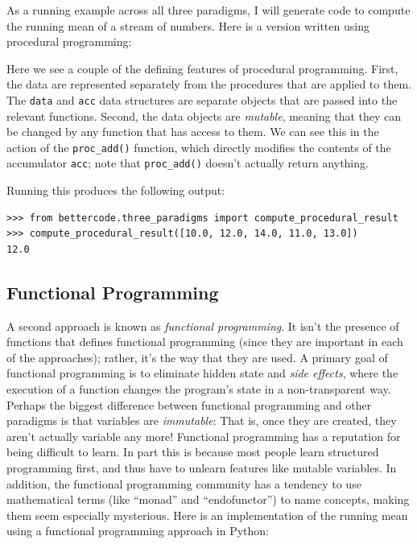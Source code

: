 As a running example across all three paradigms, I will generate code to compute the running mean of a stream of numbers.  Here is a version written using procedural programming:



Here we see a couple of the defining features of procedural programming.  First, the data are represented separately from the procedures that are applied to them.  The \texttt{data} and \texttt{acc} data structures are separate objects that are passed into the relevant functions.  Second, the data objects are \textit{mutable}, meaning that they can be changed by any function that has access to them. We can see this in the action of the \texttt{proc\_add()} function, which directly modifies the contents of the accumulator \texttt{acc}; note that \texttt{proc\_add()} doesn't actually return anything.  

Running this produces the following output:

\begin{lstlisting}[style=replshort]
>>> from bettercode.three_paradigms import compute_procedural_result
>>> compute_procedural_result([10.0, 12.0, 14.0, 11.0, 13.0])
12.0
\end{lstlisting}


\subsection{Functional Programming}

A second approach is known as \textit{functional programming}.  It isn't the presence of functions that defines functional programming (since they are important in each of the approaches); rather, it's the way that they are used.  A primary goal of functional programming is to eliminate hidden state and \textit{side effects}, where the execution of a function changes the program's state in a non-transparent way.  Perhaps the biggest difference between functional programming and other paradigms is that variables are \textit{immutable}: That is, once they are created, they aren't actually variable any more!  Functional programming has a reputation for being difficult to learn. In part this is because most people learn structured programming first, and thus have to unlearn features like mutable variables. In addition, the functional programming community has a tendency to use mathematical terms (like ``monad'' and ``endofunctor'') to name concepts, making them seem especially mysterious.  Here is an implementation of the running mean using a functional programming approach in Python:


